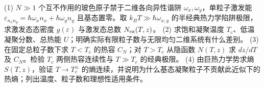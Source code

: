 (1) \(N\gg1\) 个互不作用的玻色原子禁于二维各向异性谐阱 \(\omega_x,\omega_y\)，单粒子激发能 \(\varepsilon_{n_xn_y}=\hbar\omega_x n_x+\hbar\omega_y n_y\) 且基态置零。取 \(k_BT\gg\hbar\omega_{x,y}\) 的半经典热力学陷阱极限，求激发态态密度 \(g(\varepsilon)\) 与激发态总数 \(N_{\rm ex}(T,z)\)。
(2) 求饱和凝聚温度 \(T_c\)、低温凝聚分数、总热能 \(U\)；明确实际有限粒子数与无限均匀二维系统有什么差别。
(3) 在固定总粒子数下求 \(T<T_c\) 的热容 \(C_N\)；对 \(T>T_c\) 从隐函数 \(N(T,z)\) 求 \(dz/dT\) 及 \(C_N\)。检验 \(T_c\) 两侧热容连续性与 \(T\gg T_c\) 的经典极限。
(4) 由巨热力学势求熵 \(S(T,z)\)，验证 \(T\to T_c^\pm\) 的熵连续，并说明为什么基态凝聚粒子不贡献此近似下的热熵；列出温度、粒子数和理想性适用条件。
